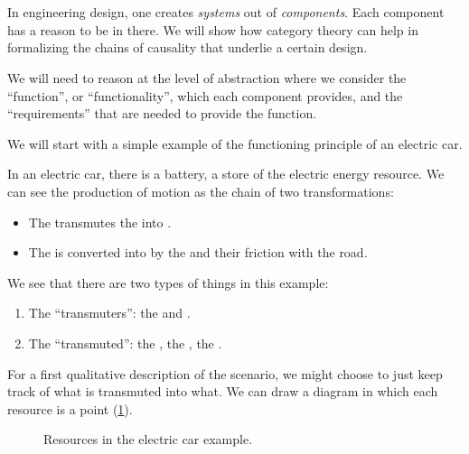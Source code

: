 
\section{}




In engineering design, one creates \emph{systems} out of \emph{components}. Each component has a reason to be in there. We will show how category theory can help in formalizing the chains of causality that underlie a certain design.

We will need to reason at the level of abstraction where we consider the ``function'', or ``functionality'', which each component provides, and the ``requirements'' that are needed to provide the function.

We will start with a simple example of the functioning principle of an electric car.

In an electric car, there is a battery, a store of the electric energy resource. We can see the production of motion as the chain of two transformations:

\begin{itemize}
  \item The \motor transmutes the \electricpower into \rotationalmotion.
  \item The \rotationalmotion is converted into \translationalmotion by the \wheels and their friction with the road.
\end{itemize}

We see that there are two types of things in this example:
\begin{enumerate}
  \item The ``transmuters'': the \motor and \wheels.
  \item The ``transmuted'': the \electricpower, the \rotationalmotion, the \translationalmotion.
\end{enumerate}

For a first qualitative description of the scenario, we might choose to just keep track of what is transmuted into what. We can draw a diagram in which each resource is a point (\cref{fig:e1}).

\begin{figure}[h!]
  \centering
  \caption{Resources in the electric car example.}
  \label{fig:e1}
\end{figure}



